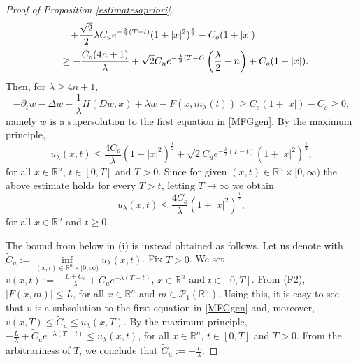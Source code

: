 \documentclass{amsart}
\theoremstyle{remark}
\theoremstyle{definition}
\theoremstyle{Claim}
\newcommand{\R}{\mathbb{R}}
\theoremstyle{plain}
\begin{document}
\begin{proof}[Proof of Proposition \ref{estimatesapriori}]
$$\begin{array}{l}
			\vspace{0.2cm}\displaystyle{\hspace{0.6cm}+\frac{\sqrt{2}}{2}\lambda C_u e^{-\frac{\lambda}{2}(T-t)}(1+\lvert x\rvert^2)^{\frac{1}{2}}-C_o(1+\lvert x\rvert)}\\
			\displaystyle{\hspace{0.3cm}\geq -\frac{C_o(4n+1)}{\lambda}+\sqrt{2}C_u e^{-\frac{\lambda}{2}(T-t)}\left(\frac{\lambda}{2}-n\right)+C_o(1+\lvert x\rvert).}
		\end{array}$$
		Then, for $\lambda\geq 4n+1$, 
		$$-\partial_t w-\Delta w+\frac{1}{\lambda}H(Dw,x)+\lambda w-F(x,m_\lambda(t))\geq C_o(1+\lvert x\rvert)-C_o\geq 0,$$
		namely $w$ is a supersolution to the first equation in \eqref{MFGgen}. By the maximum principle, $$u_\lambda(x,t)\leq \frac{4C_o}{\lambda}(1+\lvert x\rvert^2)^{\frac{1}{2}}+\sqrt{2}C_{u}e^{-\frac{\lambda}{2}(T-t)}(1+\lvert x\rvert^2)^{\frac{1}{2}},$$
		for all $x\in\mathbb{R}^n$, $t\in [0,T]$ and $T>0$. Since for given $(x,t)\in\mathbb{R}^n\times [0,\infty)$ the above estimate holds for every $T>t$, letting $T\to\infty$ we obtain 
		$$u_\lambda(x,t)\leq \frac{4C_o}{\lambda}(1+\lvert x\rvert^2)^{\frac{1}{2}},$$
		for all $x\in\mathbb{R}^n$ and $t\geq0$.
		
		The bound from below in (i) is instead obtained as follows. Let us denote with $\tilde{C}_u:=\underset{(x,t) \in \R^n \times [0,\infty)}{\inf} u_\lambda(x,t)$. Fix $T>0$. We set $v(x,t):=-\frac{L+C_o}{\lambda}+\tilde{C}_ue^{-\lambda(T-t)}$, $x\in\mathbb{R}^n$ and $t\in [0,T]$. From (F2), $\lvert F(x,m)\rvert\leq L$, for all $x\in\mathbb{R}^n$ and $m\in \mathcal{P}_1(\mathbb{R}^n)$. Using this, it is easy to see that $v$ is a subsolution to the first equation in \eqref{MFGgen} and, moreover, $v(x,T)\leq\tilde{C}_u\leq u_\lambda(x,T)$. By the maximum principle, $-\frac{L}{\lambda}+\tilde{C}_ue^{-\lambda(T-t)}\leq u_\lambda(x,t)$, for all $x\in\mathbb{R}^n$, $t\in [0,T]$ and $T>0$. From the arbitrariness of $T$, we conclude that $\tilde{C}_u:=-\frac{L}{\lambda}$.
		
		\vspace{0.3cm}
		

\end{proof}
\end{document}
